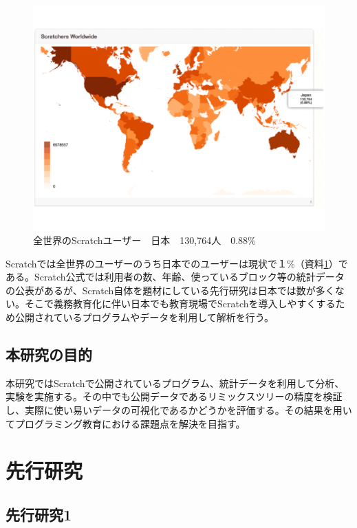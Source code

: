 \documentclass[a4paper,10pt,onecolumn,oneside,openany]{jsbook}
\begin{document}
\begin{figure}[h]
  \centering
    \includegraphics[scale=0.4]{graphic/world_japan.pdf}
  \caption{全世界のScratchユーザー　日本　130,764人　0.88\%}
  \label{num}
\end{figure}

Scratchでは全世界のユーザーのうち日本でのユーザーは現状で１\%（資料\ref{num}）である。Scratch公式では利用者の数、年齢、使っているブロック等の統計データの公表があるが、Scratch自体を題材にしている先行研究は日本では数が多くない。そこで義務教育化に伴い日本でも教育現場でScratchを導入しやすくするため公開されているプログラムやデータを利用して解析を行う。

\newpage
\section{本研究の目的}

本研究ではScratchで公開されているプログラム、統計データを利用して分析、実験を実施する。その中でも公開データであるリミックスツリーの精度を検証し、実際に使い易いデータの可視化であるかどうかを評価する。その結果を用いてプログラミング教育における課題点を解決を目指す。

\chapter{先行研究}
\section{先行研究1}
\end{document}
